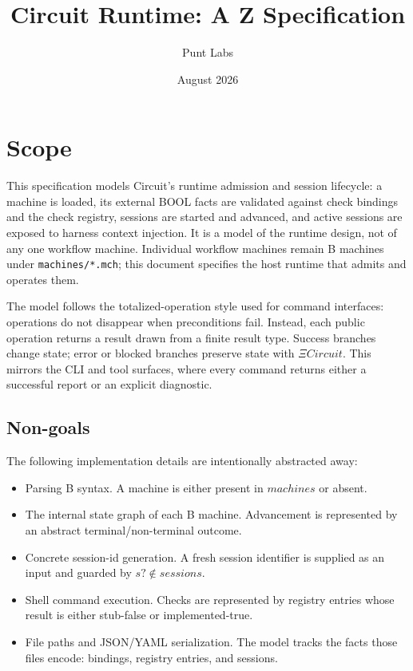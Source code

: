 \documentclass[a4paper,10pt,fleqn]{article}
\begin{document}
\title{Circuit Runtime: A Z Specification}
\author{Punt Labs}
\date{August 2026}
\maketitle
\tableofcontents
\newpage

\section{Scope}

This specification models Circuit's runtime admission and session lifecycle: a
machine is loaded, its external BOOL facts are validated against check bindings
and the check registry, sessions are started and advanced, and active sessions
are exposed to harness context injection. It is a model of the runtime design,
not of any one workflow machine. Individual workflow machines remain B machines
under \texttt{machines/*.mch}; this document specifies the host runtime that
admits and operates them.

The model follows the totalized-operation style used for command interfaces:
operations do not disappear when preconditions fail. Instead, each public
operation returns a result drawn from a finite result type. Success branches
change state; error or blocked branches preserve state with $\Xi Circuit$.
This mirrors the CLI and tool surfaces, where every command returns either a
successful report or an explicit diagnostic.

\subsection{Non-goals}

The following implementation details are intentionally abstracted away:

\begin{itemize}
  \item Parsing B syntax. A machine is either present in $machines$ or absent.
  \item The internal state graph of each B machine. Advancement is represented
    by an abstract terminal/non-terminal outcome.
  \item Concrete session-id generation. A fresh session identifier is supplied
    as an input and guarded by $s? \notin sessions$.
  \item Shell command execution. Checks are represented by registry entries
    whose result is either stub-false or implemented-true.
  \item File paths and JSON/YAML serialization. The model tracks the facts those
    files encode: bindings, registry entries, and sessions.
\end{itemize}
\end{document}
